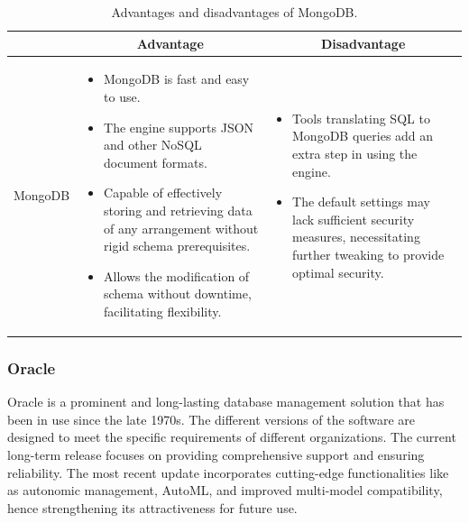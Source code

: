 \begin{table}[H]
    \centering
    \begin{tabular}{| c | p{} | p{} |}
        \hline
        \multicolumn{1}{|c|}{}
        & \multicolumn{1}{c|}{Advantage}
        & \multicolumn{1}{c|}{Disadvantage} \\ \hline
        \multirow{7}{*}{MongoDB}     
                &   \begin{itemize}[leftmargin=*,topsep=0pt,partopsep=0pt,parsep=0pt]
                        \item MongoDB is fast and easy to use.
                        \item The engine supports JSON and other NoSQL document formats.
                        \item Capable of effectively storing and retrieving data of any arrangement without rigid schema prerequisites.
                        \item  Allows the modification of schema without downtime, facilitating flexibility.
                    \end{itemize}
                &   \begin{itemize}[leftmargin=*,topsep=0pt,partopsep=0pt,parsep=0pt]
                        \item Tools translating SQL to MongoDB queries add an extra step in using the engine.
                        \item The default settings may lack sufficient security measures, necessitating further tweaking to provide optimal security.
                    \end{itemize} \\ \hline
    \end{tabular}
    \caption{Advantages and disadvantages of MongoDB.}
\end{table}

\subsubsection{Oracle}

Oracle is a prominent and long-lasting database management solution that has been in use since the late 1970s. The different versions of the software are designed to meet the specific requirements of different organizations. The current long-term release focuses on providing comprehensive support and ensuring reliability. The most recent update incorporates cutting-edge functionalities like as autonomic management, AutoML, and improved multi-model compatibility, hence strengthening its attractiveness for future use.

